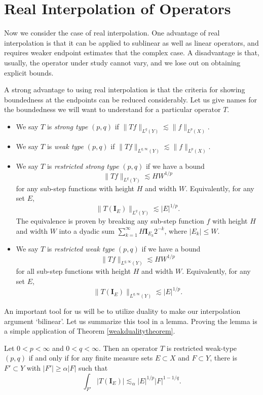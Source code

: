 \section{Real Interpolation of Operators}

Now we consider the case of real interpolation. One advantage of real interpolation is that it can be applied to sublinear as well as linear operators, and requires weaker endpoint estimates that the complex case. A disadvantage is that, usually, the operator under study cannot vary, and we lose out on obtaining explicit bounds.

A strong advantage to using real interpolation is that the criteria for showing boundedness at the endpoints can be reduced considerably. Let us give names for the boundedness we will want to understand for a particular operator $T$.
%
\begin{itemize}
  \item We say $T$ is \emph{strong type} $(p,q)$ if $\| Tf \|_{L^q(Y)} \lesssim \| f \|_{L^p(X)}$.

  \item We say $T$ is \emph{weak type} $(p,q)$ if $\| Tf \|_{L^{q,\infty}(Y)} \lesssim \| f \|_{L^p(X)}$.

  \item We say $T$ is \emph{restricted strong type} $(p,q)$ if we have a bound
  \[ \| Tf \|_{L^q(Y)} \lesssim HW^{1/p} \]
  for any sub-step functions with height $H$ and width $W$. Equivalently, for any set $E$,
  \[ \| T(\mathbf{I}_E) \|_{L^q(Y)} \lesssim |E|^{1/p}. \]
  The equivalence is proven by breaking any sub-step function $f$ with height $H$ and width $W$ into a dyadic sum $\sum_{k = 1}^\infty H \mathbf{I}_{E_k} 2^{-k}$, where $|E_k| \leq W$.

  \item We say $T$ is \emph{restricted weak type} $(p,q)$ if we have a bound
  \[ \| Tf \|_{L^{q,\infty}(Y)} \lesssim HW^{1/p} \]
  for all sub-step functions with height $H$ and width $W$. Equivalently, for any set $E$,
  \[ \| T(\mathbf{I}_E) \|_{L^{q,\infty}(Y)} \lesssim |E|^{1/p}. \]
\end{itemize}
%
An important tool for us will be to utilize duality to make our interpolation argument `bilinear'. Let us summarize this tool in a lemma. Proving the lemma is a simple application of Theorem \ref{weakdualitytheorem}.

\begin{lemma}
  Let $0 < p < \infty$ and $0 < q < \infty$. Then an operator $T$ is restricted weak-type $(p,q)$ if and only if for any finite measure sets $E \subset X$ and $F \subset Y$, there is $F' \subset Y$ with $|F'| \geq \alpha |F|$ such that
  \[ \int_{F'} |T(\mathbf{I}_E)| \lesssim_\alpha |E|^{1/p} |F|^{1-1/q}. \]
\end{lemma}

